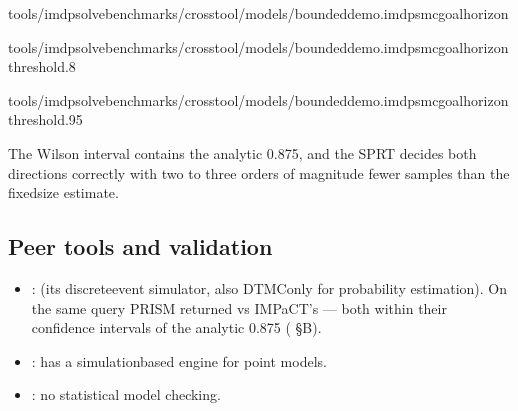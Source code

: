 \documentclass[a4paper,10pt,english]{sphinxmanual}
\begin{document}
\begin{sphinxVerbatim}[commandchars=\\\{\}]
tools/imdp\PYGZus{}solvebenchmarks/crosstool/models/bounded\PYGZus{}demo.imdpsmcgoal\PYGZhy{}\PYGZhy{}horizon

tools/imdp\PYGZus{}solvebenchmarks/crosstool/models/bounded\PYGZus{}demo.imdpsmcgoal\PYGZhy{}\PYGZhy{}horizon\PYGZhy{}\PYGZhy{}threshold.8

tools/imdp\PYGZus{}solvebenchmarks/crosstool/models/bounded\PYGZus{}demo.imdpsmcgoal\PYGZhy{}\PYGZhy{}horizon\PYGZhy{}\PYGZhy{}threshold.95
\end{sphinxVerbatim}

\sphinxAtStartPar
The Wilson interval \sphinxcode{\sphinxupquote{{[}0.87264, 0.87675{]}}} contains the analytic 0.875, and the SPRT
decides both directions correctly with two to three orders of magnitude fewer samples
than the fixed\sphinxhyphen{}size estimate.


\subsection{Peer tools and validation}
\label{\detokenize{manual/smc:peer-tools-and-validation}}\begin{itemize}
\item {} 
\sphinxAtStartPar
{}:  (its discrete\sphinxhyphen{}event simulator, also DTMC\sphinxhyphen{}only for probability
estimation). On the same query PRISM  returned  vs IMPaCT’s
 — both within their confidence intervals of the analytic 0.875
( \S{}B).

\item {} 
\sphinxAtStartPar
{}: has a simulation\sphinxhyphen{}based engine for point models.

\item {} 
\sphinxAtStartPar
{}: no statistical model checking.

\end{itemize}
\end{document}
